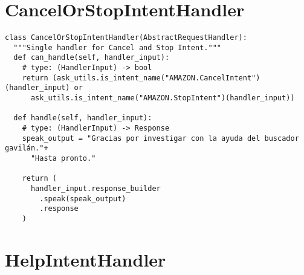 
\section{CancelOrStopIntentHandler}
\label{A3Anexo}

\begin{tcolorbox}[colback=white!25!white,colframe=blue]
  \begin{verbatim}
class CancelOrStopIntentHandler(AbstractRequestHandler):
  """Single handler for Cancel and Stop Intent."""
  def can_handle(self, handler_input):
    # type: (HandlerInput) -> bool
    return (ask_utils.is_intent_name("AMAZON.CancelIntent")(handler_input) or
      ask_utils.is_intent_name("AMAZON.StopIntent")(handler_input))

  def handle(self, handler_input):
    # type: (HandlerInput) -> Response
    speak_output = "Gracias por investigar con la ayuda del buscador gavilán."+
      "Hasta pronto."

    return (
      handler_input.response_builder
        .speak(speak_output)
        .response
    )
  \end{verbatim}
\end{tcolorbox}


\section{HelpIntentHandler}
\label{A4Anexo}

